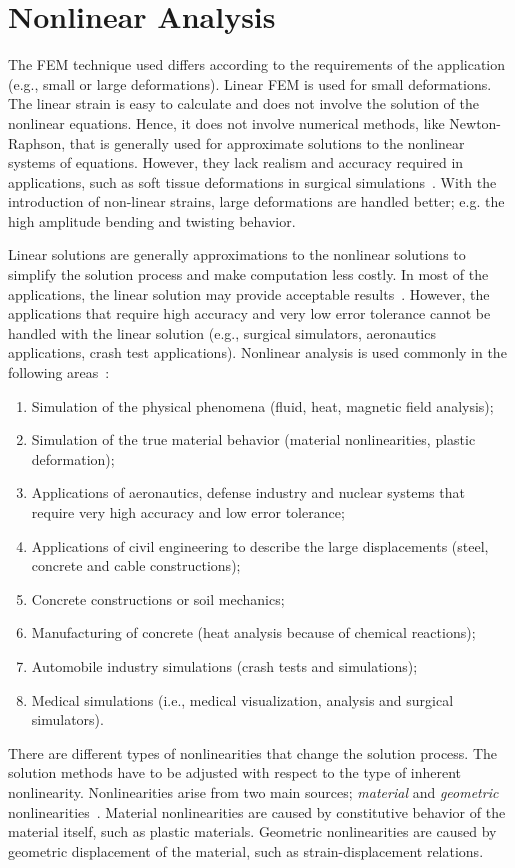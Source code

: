 \section{Nonlinear Analysis}
\label{sec:nonlinearities}

The FEM technique used differs according to the requirements of the application (e.g., small or large deformations). Linear FEM is used for small deformations. The linear strain is easy to calculate and does not involve the solution of the nonlinear equations. Hence, it does not involve numerical methods, like Newton-Raphson, that is generally used for approximate solutions to the nonlinear systems of equations. However, they lack realism and accuracy required in applications, such as soft tissue deformations in surgical simulations~\cite{Bro98,Cotin98}. With the introduction of non-linear strains, large deformations are handled better; e.g. the high amplitude bending and twisting behavior.

Linear solutions are generally approximations to the nonlinear solutions to simplify the solution process and make computation less costly. In most of the applications, the linear solution may provide acceptable results~\cite{Reddy03}. However, the applications that require high accuracy and very low error tolerance cannot be handled with the linear solution (e.g., surgical simulators, aeronautics applications, crash test applications). Nonlinear analysis is used commonly in the following areas~\cite{Wriggers08}:

\begin{enumerate}
\item Simulation of the physical phenomena (fluid, heat, magnetic field analysis);
\item Simulation of the true material behavior (material nonlinearities, plastic deformation);
\item Applications of aeronautics, defense industry and nuclear systems that require very high accuracy and low error tolerance;
\item Applications of civil engineering to describe the large displacements (steel, concrete and cable constructions);
\item Concrete constructions or soil mechanics;
\item Manufacturing of concrete (heat analysis because of chemical reactions);
\item Automobile industry simulations (crash tests and simulations);
\item Medical simulations (i.e., medical visualization, analysis and surgical simulators).
\end{enumerate}

There are different types of nonlinearities that change the solution process. The solution methods have to be adjusted with respect to the type of inherent nonlinearity. Nonlinearities arise from two main sources; \textit{material} and \textit{geometric} nonlinearities~\cite{Reddy03}. Material nonlinearities are caused by constitutive behavior of the material itself, such as plastic materials. Geometric nonlinearities are caused by geometric displacement of the material, such as strain-displacement relations.